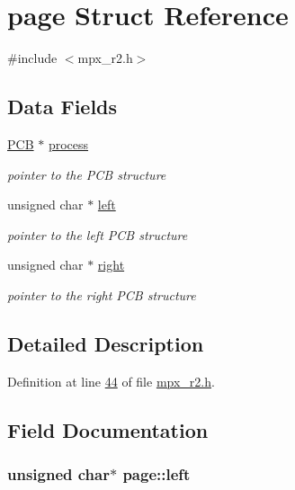 \hypertarget{structpage}{
\section{page Struct Reference}
\label{structpage}
}


{\ttfamily \#include $<$mpx\_\-r2.h$>$}

\subsection*{Data Fields}
\begin{DoxyCompactItemize}
\item 
\hyperlink{structprocess}{PCB} $\ast$ \hyperlink{structpage_af3cc0e1320b79159b230f154f1a95f0d}{process}
\begin{DoxyCompactList}\small\item\em pointer to the PCB structure \item\end{DoxyCompactList}\item 
unsigned char $\ast$ \hyperlink{structpage_a450d16b8cb803158a4dab05bb36fd7f5}{left}
\begin{DoxyCompactList}\small\item\em pointer to the left PCB structure \item\end{DoxyCompactList}\item 
unsigned char $\ast$ \hyperlink{structpage_a59bb1b5eca2d579befcc93a2833f4dfd}{right}
\begin{DoxyCompactList}\small\item\em pointer to the right PCB structure \item\end{DoxyCompactList}\end{DoxyCompactItemize}


\subsection{Detailed Description}


Definition at line \hyperlink{mpx__r2_8h_source_l00044}{44} of file \hyperlink{mpx__r2_8h_source}{mpx\_\-r2.h}.



\subsection{Field Documentation}
\hypertarget{structpage_a450d16b8cb803158a4dab05bb36fd7f5}{
\subsubsection[{left}]{\setlength{\rightskip}{0pt plus 5cm}unsigned char$\ast$ {\bf page::left}}}
\label{structpage_a450d16b8cb803158a4dab05bb36fd7f5}


